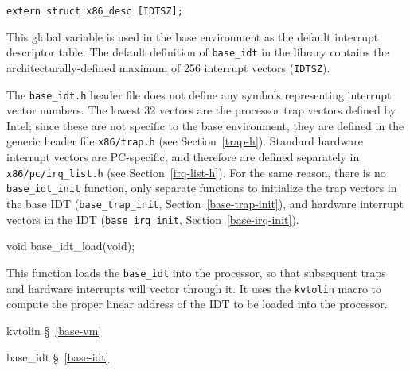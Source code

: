 \label{base-idt}
\begin{apisyn}

	{\tt extern struct x86_desc [IDTSZ];}
\end{apisyn}
\begin{apidesc}
	This global variable is used in the base environment
	as the default interrupt descriptor table.
	The default definition of {\tt base_idt} in the library
	contains the architecturally-defined maximum
	of 256 interrupt vectors ({\tt IDTSZ}).

	The {\tt base_idt.h} header file does not define any symbols
	representing interrupt vector numbers.
	The lowest 32 vectors are the processor trap vectors defined by Intel;
	since these are not specific to the base environment,
	they are defined in the generic header file {\tt x86/trap.h}
	(see Section~\ref{trap-h}).
	Standard hardware interrupt vectors are PC-specific,
	and therefore are defined separately in {\tt x86/pc/irq_list.h}
	(see Section~\ref{irq-list-h}).
	For the same reason,
	there is no {\tt base_idt_init} function,
	only separate functions to initialize
	the trap vectors in the base IDT
	({\tt base_trap_init}, Section~\ref{base-trap-init}),
	and hardware interrupt vectors in the IDT
	({\tt base_irq_init}, Section~\ref{base-irq-init}).
\end{apidesc}

\label{base-idt-load}
\begin{apisyn}

	\funcproto void base_idt_load(void);
\end{apisyn}
\begin{apidesc}
	This function loads the {\tt base_idt} into the processor,
	so that subsequent traps and hardware interrupts
	will vector through it.
	It uses the {\tt kvtolin} macro
	to compute the proper linear address of the IDT
	to be loaded into the processor.
\end{apidesc}
\begin{apidep}
	\item[kvtolin]		\S~\ref{base-vm}
	\item[base_idt]		\S~\ref{base-idt}
\end{apidep}

